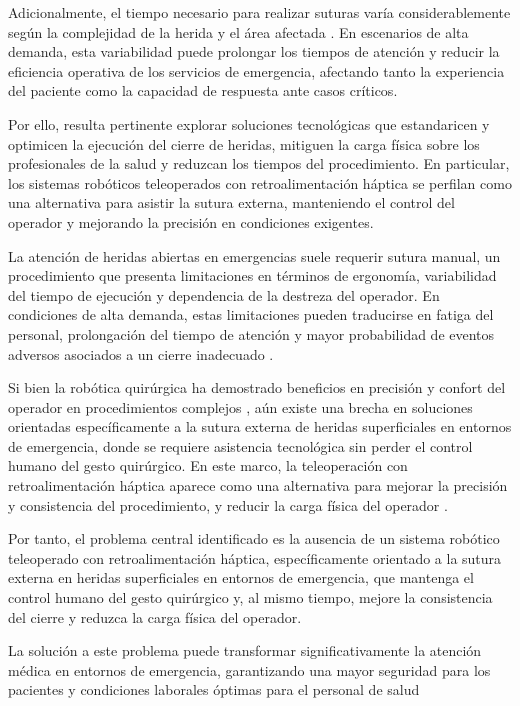 Adicionalmente, el tiempo necesario para realizar suturas varía
considerablemente según la complejidad de la herida y el área afectada
\cite{Forsch}. En escenarios de alta demanda, esta variabilidad puede prolongar
los tiempos de atención y reducir la eficiencia operativa de los servicios de
emergencia, afectando tanto la experiencia del paciente como la capacidad de
respuesta ante casos críticos.

Por ello, resulta pertinente explorar soluciones tecnológicas que estandaricen
y optimicen la ejecución del cierre de heridas, mitiguen la carga física sobre
los profesionales de la salud y reduzcan los tiempos del procedimiento. En
particular, los sistemas robóticos teleoperados con retroalimentación háptica
se perfilan como una alternativa para asistir la sutura externa, manteniendo el
control del operador y mejorando la precisión en condiciones exigentes.


La atención de heridas abiertas en emergencias suele requerir sutura manual, un
procedimiento que presenta limitaciones en términos de ergonomía, variabilidad
del tiempo de ejecución y dependencia de la destreza del operador. En
condiciones de alta demanda, estas limitaciones pueden traducirse en fatiga del
personal, prolongación del tiempo de atención y mayor probabilidad de eventos
adversos asociados a un cierre inadecuado
\cite{Informe_emergencia_2021,Instru_quirurgica}.

Si bien la robótica quirúrgica ha demostrado beneficios en precisión y confort
del operador en procedimientos complejos
\cite{DaVinci,coronado_bienestar_2022}, aún existe una brecha en soluciones
orientadas específicamente a la sutura externa de heridas superficiales en
entornos de emergencia, donde se requiere asistencia tecnológica sin perder el
control humano del gesto quirúrgico. En este marco, la teleoperación con
retroalimentación háptica aparece como una alternativa para mejorar la
precisión y consistencia del procedimiento, y reducir la carga física del
operador \cite{SIngle}.

Por tanto, el problema central identificado es la ausencia de un sistema
robótico teleoperado con retroalimentación háptica, específicamente orientado a
la sutura externa en heridas superficiales en entornos de emergencia, que
mantenga el control humano del gesto quirúrgico y, al mismo tiempo, mejore la
consistencia del cierre y reduzca la carga física del operador.

La solución a este problema puede transformar significativamente la atención
médica en entornos de emergencia, garantizando una mayor seguridad para los
pacientes y condiciones laborales óptimas para el personal de salud

